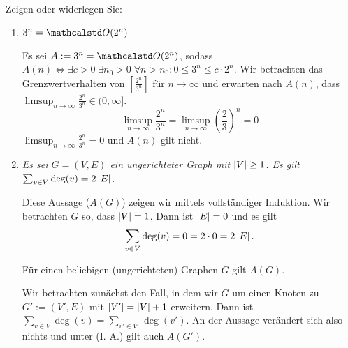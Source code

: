 \documentclass[10pt]{article}
\begin{document}
    \makecover

    \begin{aufgabe}[0]
        Zeigen oder widerlegen Sie:
    \end{aufgabe}

    \begin{loesung}
        \begin{enumerate}
            \item \textsl{$3^n = \O(2^n)$}

            \begin{gegenbeweis}
                Es sei $A := 3^n = \O(2^n)$, sodass $A(n) \iff \exists c > 0 \; \exists n_0 > 0 \; \forall n > n_0 : 0 \leq 3^n \leq c \cdot 2^n$.
                Wir betrachten das Grenzwertverhalten von $\left[\frac{2^n}{3^n}\right]$ für $n \to \infty$ und erwarten nach $A(n)$, dass $\limsup_{n \to \infty} \frac{2^n}{3^n} \in (0, \infty]$.
                \[
                    \limsup_{n \to \infty} \frac{2^n}{3^n} = \limsup_{n \to \infty} \left(\frac{2}{3}\right)^n = 0
                \]
                $\limsup_{n \to \infty} \frac{2^n}{3^n} = 0$ und $A(n)$ gilt nicht.
            \end{gegenbeweis}

            \item \textsl{Es sei $G = (V, E)$ ein ungerichteter Graph mit $\left|V\right| \geq 1$.
            Es gilt $\sum_{v \in V} \deg(v) = 2 \left|E\right|$.}

            \begin{beweis}
                Diese Aussage ($A(G)$) zeigen wir mittels vollständiger Induktion.
                \IB Wir betrachten $G$ so, dass $\left|V\right| = 1$.
                Dann ist $\left|E\right| = 0$ und es gilt
                \[
                    \sum_{v \in V} \deg(v) = 0 = 2 \cdot 0 = 2 \left|E\right|.
                \]

                \IA Für einen beliebigen (ungerichteten) Graphen $G$ gilt $A(G)$.

                \IS[1] Wir betrachten zunächst den Fall, in dem wir $G$ um einen Knoten zu $G' := (V', E)$ mit $\left|V'\right| = \left|V\right| + 1$ erweitern.
                Dann ist $\sum_{v \in V} \deg(v) = \sum_{v' \in V'} \deg(v')$.
                An der Aussage verändert sich also nichts und unter \textsf{(I. A.)} gilt auch $A(G')$.


\end{beweis}
\end{enumerate}
\end{loesung}
\end{document}
